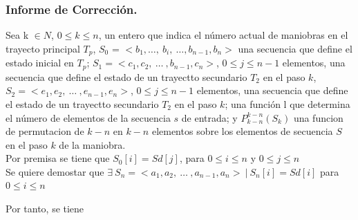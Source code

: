 \documentclass[12pt, a4paper]{article}
\begin{document}
\subsubsection{Informe de Corrección.}
Sea k $\in N$, $ 0 \leq k \leq n$, un entero que indica el número actual de maniobras en el trayecto principal $T_p$,
$S_0$ = $<b_1, \ldots,~b_i,~\ldots, b_{n-1}, b_n>$ una secuencia que define el estado inicial en $T_p$;
$S_1 = < c_1, c_2,~\ldots~, b_{n-1}, c_n >$, $ 0 \leq j \leq n - 1$ elementos, una secuencia que define el estado de un trayectto secundario $T_2$ en el paso $k$,
$S_2 =  < e_1, e_2,~\ldots~, e_{n-1}, e_n >$, $ 0 \leq j \leq n - 1$ elementos, una secuencia que define el estado de un trayectto secundario $T_2$ en el paso $k$;
una función l que determina el número de elementos de la secuencia $s$ de entrada;
y $P_{k-n}^{k-n}(S_k)$ una funcion de permutacion de $k-n$ en $k-n$ elementos sobre los elementos de secuencia
$S$ en el paso $k$ de la maniobra. \\
Por premisa se tiene que $S_0[i] = Sd[j]$,  para $0 \leq i \leq n$ y $0 \leq j \leq n$ \\
Se quiere demostar que $\exists~ S_n = < a_1, a_2, ~\ldots~, a_{n-1}, a_n >~|~S_n[i] = Sd[i]$ para $0 \leq i \leq n$

Por tanto, se tiene \\
\end{document}
